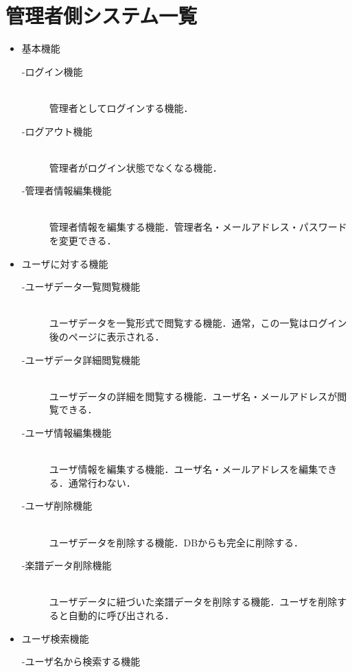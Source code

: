 \clearpage

\section{管理者側システム一覧}
\begin{itemize}
    \item 基本機能
          \begin{description}
              \item[-ログイン機能]\mbox{}\\
              管理者としてログインする機能．
              \item[-ログアウト機能] \mbox{}\\
                  管理者がログイン状態でなくなる機能．
              \item[-管理者情報編集機能] \mbox{}\\
                  管理者情報を編集する機能．管理者名・メールアドレス・パスワードを変更できる．
          \end{description}
    \item ユーザに対する機能
          \begin{description}
              \item[-ユーザデータ一覧閲覧機能] \mbox{}\\
                  ユーザデータを一覧形式で閲覧する機能．通常，この一覧はログイン後のページに表示される．
              \item[-ユーザデータ詳細閲覧機能] \mbox{}\\
                  ユーザデータの詳細を閲覧する機能．ユーザ名・メールアドレスが閲覧できる．
              \item[-ユーザ情報編集機能] \mbox{}\\
                  ユーザ情報を編集する機能．ユーザ名・メールアドレスを編集できる．通常行わない．
              \item[-ユーザ削除機能] \mbox{}\\
                  ユーザデータを削除する機能．DBからも完全に削除する．
              \item[-楽譜データ削除機能] \mbox{}\\
                  ユーザデータに紐づいた楽譜データを削除する機能．ユーザを削除すると自動的に呼び出される．
          \end{description}
    \item ユーザ検索機能
          \begin{description}
              \item[-ユーザ名から検索する機能] \mbox{}\\

\end{description}
\end{itemize}
